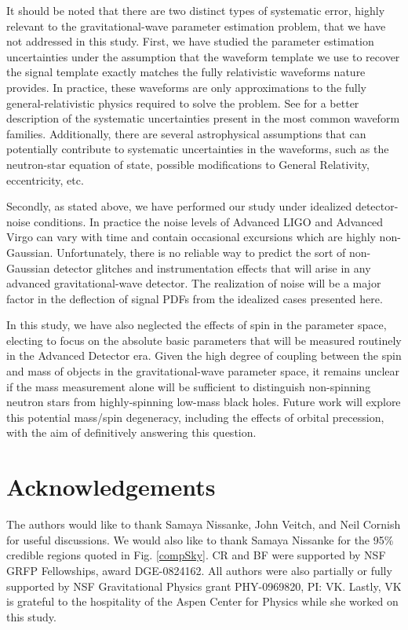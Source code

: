 \documentclass[11pt,a4paper]{emulateapj} 
\begin{document}
It should be noted that there are two distinct types of systematic
error, highly relevant to the gravitational-wave parameter estimation
problem, that we have not addressed in this study.  First, we have
studied the parameter estimation uncertainties under the assumption
that the waveform template we use to recover the signal template
exactly matches the fully relativistic waveforms nature provides.  In
practice, these waveforms are only approximations to the fully
general-relativistic physics required to solve the problem.  See
\cite{BuonannoWaveform} for a better description of the systematic uncertainties
present in the most common waveform families.  Additionally, there are
several astrophysical assumptions that can potentially contribute to
systematic uncertainties in the waveforms, such as the neutron-star
equation of state, possible modifications to General Relativity,
eccentricity, etc.

Secondly, as stated above, we have performed our study under idealized
detector-noise conditions.  In practice the noise levels of Advanced
LIGO and Advanced Virgo can vary with time and contain occasional
excursions which are highly non-Gaussian.  Unfortunately, there is no
reliable way to predict the sort of non-Gaussian detector glitches and
instrumentation effects that will arise in any advanced
gravitational-wave detector.  The realization of noise will be a
major factor in the deflection of signal PDFs from the idealized cases
presented here.

In this study, we have also neglected the effects of spin in the
parameter space, electing to focus on the absolute basic parameters
that will be measured routinely in the Advanced Detector era.  Given
the high degree of coupling between the spin and mass of objects
in the gravitational-wave parameter space, it remains unclear if the
mass measurement alone will be sufficient to distinguish non-spinning
neutron stars from highly-spinning low-mass black holes.  Future work
will explore this potential mass/spin degeneracy, including the
effects of orbital precession, with the aim of definitively answering
this question.

\pagebreak

\section{Acknowledgements}

The authors would like to thank Samaya Nissanke, John Veitch, and Neil Cornish for useful discussions.  We would also like to thank Samaya Nissanke for the 95\% credible regions
quoted in Fig. \ref{compSky}. CR and BF were supported by NSF GRFP Fellowships, award DGE-0824162.  All authors were also partially or fully supported by NSF Gravitational Physics grant PHY-0969820, PI: VK. Lastly, VK is grateful to the hospitality of the Aspen Center for Physics while she worked on this study. 
\end{document}
